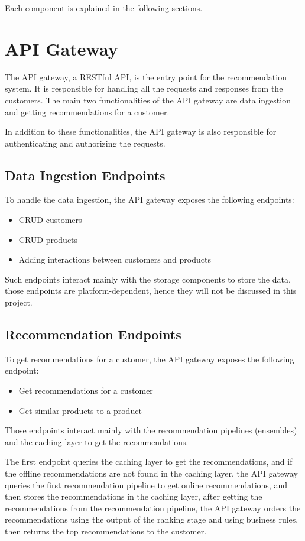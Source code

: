 Each component is explained in the following sections.

\section{API Gateway}

The API gateway, a RESTful API, is the entry point for the recommendation system.
It is responsible for handling all the requests and responses from the customers.
The main two functionalities of the API gateway are data ingestion and getting recommendations for a customer.

In addition to these functionalities, the API gateway is also responsible for authenticating and authorizing the requests.

\subsection{Data Ingestion Endpoints}

To handle the data ingestion, the API gateway exposes the following endpoints:
\begin{itemize}
    \item CRUD customers
    \item CRUD products
    \item Adding interactions between customers and products
\end{itemize}

Such endpoints interact mainly with the storage components to store the data, those endpoints are platform-dependent, hence they will not be discussed in this project.

\subsection{Recommendation Endpoints}

To get recommendations for a customer, the API gateway exposes the following endpoint:
\begin{itemize}
    \item Get recommendations for a customer
    \item Get similar products to a product
\end{itemize}

Those endpoints interact mainly with the recommendation pipelines (ensembles) and the caching layer to get the recommendations.

The first endpoint queries the caching layer to get the recommendations, and if the offline recommendations are not found in the caching layer, 
the API gateway queries the first recommendation pipeline to get online recommendations, and then stores the recommendations in the caching layer, 
after getting the recommendations from the recommendation pipeline, 
the API gateway orders the recommendations using the output of the ranking stage and using business rules, then returns the top recommendations to the customer.

